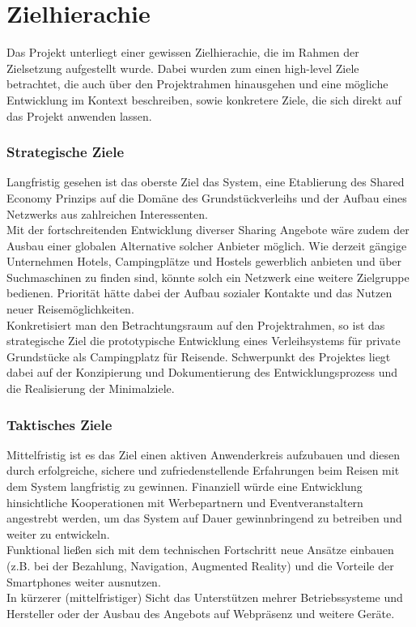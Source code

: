 
\section{Zielhierachie}
Das Projekt unterliegt einer gewissen Zielhierachie, die im Rahmen der Zielsetzung aufgestellt wurde. Dabei wurden zum einen high-level Ziele betrachtet, die auch über den Projektrahmen hinausgehen und eine mögliche Entwicklung im Kontext beschreiben, sowie konkretere Ziele, die sich direkt auf das Projekt anwenden lassen.


\subsubsection{Strategische Ziele}
Langfristig gesehen ist das oberste Ziel das System, eine Etablierung des Shared Economy Prinzips auf die Domäne des Grundstückverleihs und der Aufbau eines Netzwerks aus zahlreichen Interessenten.\\
Mit der fortschreitenden Entwicklung diverser Sharing Angebote wäre zudem der Ausbau einer globalen Alternative solcher Anbieter möglich. Wie derzeit gängige Unternehmen Hotels, Campingplätze und Hostels gewerblich anbieten und über Suchmaschinen zu finden sind, könnte solch ein Netzwerk eine weitere Zielgruppe bedienen. Priorität hätte dabei der Aufbau sozialer Kontakte und das Nutzen neuer Reisemöglichkeiten.\\

Konkretisiert man den Betrachtungsraum auf den Projektrahmen, so ist das strategische Ziel die prototypische Entwicklung eines Verleihsystems für private Grundstücke als Campingplatz für Reisende. Schwerpunkt des Projektes liegt dabei auf der Konzipierung und Dokumentierung des Entwicklungsprozess und die Realisierung der Minimalziele.\\


\subsubsection{Taktisches Ziele}
Mittelfristig ist es das Ziel einen aktiven Anwenderkreis aufzubauen und diesen durch erfolgreiche, sichere und zufriedenstellende Erfahrungen beim Reisen mit dem System langfristig zu gewinnen.
Finanziell würde eine Entwicklung hinsichtliche Kooperationen mit Werbepartnern und Eventveranstaltern angestrebt werden, um das System auf Dauer gewinnbringend zu betreiben und weiter zu entwickeln. \\
Funktional ließen sich mit dem technischen Fortschritt neue Ansätze einbauen (z.B. bei der Bezahlung, Navigation, Augmented Reality) und die Vorteile der Smartphones weiter ausnutzen. \\
In kürzerer (mittelfristiger) Sicht das Unterstützen mehrer Betriebssysteme und Hersteller oder der Ausbau des Angebots auf Webpräsenz und weitere Geräte.\\

